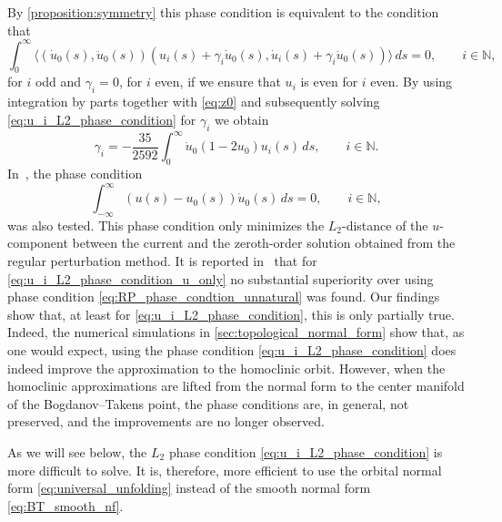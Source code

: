 By \cref{proposition:symmetry} this phase condition is
equivalent to the condition that
\begin{equation}
     \label{eq:u_i_L2_phase_condition}
  \int_0^\infty 
        \langle
        (\dot u_0(s), \ddot u_0(s)) (u_{i}(s) + \gamma_i \dot u_0(s),
        \dot u_{i}(s) + \gamma_i \ddot u_0(s)) 
        \rangle
        \, ds = 0,
    \qquad i \in \mathbb{N},
\end{equation}
for $i$ odd and $\gamma_i=0$, for $i$ even, if we ensure that $u_i$ is even for $i$
even. By using integration by parts together with \cref{eq:z0} and subsequently
solving \cref{eq:u_i_L2_phase_condition} for $\gamma_i$ we obtain
\begin{equation}
    \label{eq:c_i}
    \gamma_i = -\frac{35}{2592} 
            \int_0^\infty \dot u_0(1 - 2 u_0)u_{i}(s) \, ds,
        \qquad i \in \mathbb{N}.
\end{equation}
In~\cite{Kuznetsov2014improved}, the phase condition
\begin{equation}
     \label{eq:u_i_L2_phase_condition_u_only}
     \int_{-\infty}^\infty \left( u(s) - u_0(s) \right) \dot u_0(s) \, ds
     = 0,
    \qquad i \in \mathbb N,
\end{equation}
was also tested. This phase condition only minimizes the $L_2$-distance of the
$u$-component between the current and the zeroth-order solution obtained from
the regular perturbation method. It is reported in~\cite{Kuznetsov2014improved}
that for \cref{eq:u_i_L2_phase_condition_u_only} no substantial superiority
over using phase condition \cref{eq:RP_phase_condtion_unnatural} was found.
Our findings show that, at least for \cref{eq:u_i_L2_phase_condition}, this is
only partially true.  Indeed, the numerical simulations in
\cref{sec:topological_normal_form} show that, as one would expect, using the
phase condition \cref{eq:u_i_L2_phase_condition} does indeed improve the
approximation to the homoclinic orbit. However, when the homoclinic
approximations are lifted from the normal form to the center manifold of the
Bogdanov--Takens point, the phase conditions are, in general, not preserved, and
the improvements are no longer observed.

As we will see below, the $L_2$ phase condition
\cref{eq:u_i_L2_phase_condition} is more difficult to solve. It is, therefore,
more efficient to use the orbital normal form \cref{eq:universal_unfolding}
instead of the smooth normal form \cref{eq:BT_smooth_nf}.

